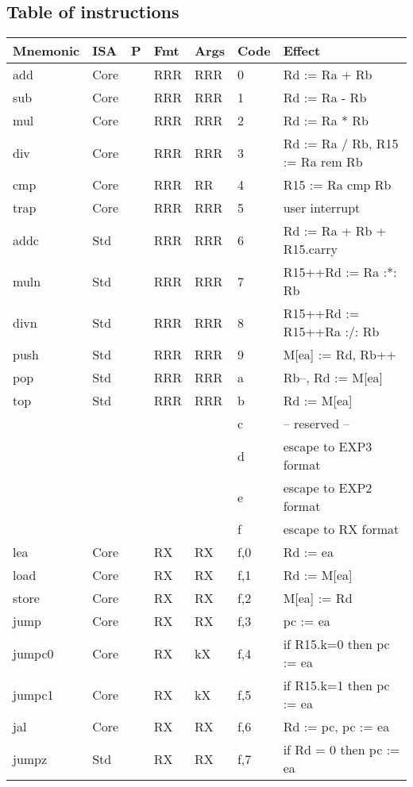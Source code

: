 \documentclass[11pt]{article}
\begin{document}
\subsection*{Table of instructions}
\label{sec:org2aa1ede}

\begin{center}
\begin{tabular}{lllllll}
\hline
Mnemonic & ISA & P & Fmt & Args & Code & Effect\\
\hline
add & Core &  & RRR & RRR & 0 & Rd := Ra + Rb\\
sub & Core &  & RRR & RRR & 1 & Rd := Ra - Rb\\
mul & Core &  & RRR & RRR & 2 & Rd := Ra * Rb\\
div & Core &  & RRR & RRR & 3 & Rd := Ra / Rb, R15 := Ra rem Rb\\
cmp & Core &  & RRR & RR & 4 & R15 := Ra cmp Rb\\
trap & Core &  & RRR & RRR & 5 & user interrupt\\
addc & Std &  & RRR & RRR & 6 & Rd := Ra + Rb + R15.carry\\
muln & Std &  & RRR & RRR & 7 & R15++Rd := Ra :*: Rb\\
divn & Std &  & RRR & RRR & 8 & R15++Rd := R15++Ra :/: Rb\\
push & Std &  & RRR & RRR & 9 & M[ea] := Rd, Rb++\\
pop & Std &  & RRR & RRR & a & Rb--, Rd := M[ea]\\
top & Std &  & RRR & RRR & b & Rd := M[ea]\\
 &  &  &  &  & c & -- reserved --\\
 &  &  &  &  & d & escape to EXP3 format\\
 &  &  &  &  & e & escape to EXP2 format\\
 &  &  &  &  & f & escape to RX format\\
\hline
lea & Core &  & RX & RX & f,0 & Rd := ea\\
load & Core &  & RX & RX & f,1 & Rd := M[ea]\\
store & Core &  & RX & RX & f,2 & M[ea] := Rd\\
jump & Core &  & RX & RX & f,3 & pc := ea\\
jumpc0 & Core &  & RX & kX & f,4 & if R15.k=0 then pc := ea\\
jumpc1 & Core &  & RX & kX & f,5 & if R15.k=1 then pc := ea\\
jal & Core &  & RX & RX & f,6 & Rd := pc, pc := ea\\
jumpz & Std &  & RX & RX & f,7 & if Rd = 0 then pc := ea\\

\end{tabular}
\end{center}
\end{document}
